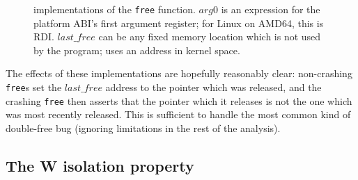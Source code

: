 \begin{figure}

  \caption{{\StateMachine} implementations of the \texttt{free}
    function. $arg0$ is an expression for the platform ABI's first
    argument register; for Linux on AMD64, this is RDI.
    $\mathit{last\_free}$ can be any fixed memory location which is
    not used by the program; {\implementation} uses an address in
    kernel space.}
  \label{fig:library_free}
\end{figure}

The effects of these implementations are hopefully reasonably clear:
non-crashing \texttt{free}s set the $\mathit{last\_free}$ address to
the pointer which was released, and the crashing \texttt{free} then
asserts that the pointer which it releases is not the one which was
most recently released.  This is sufficient to handle the most common
kind of double-free bug (ignoring limitations in the rest of the
analysis).  

\subsection{The W isolation property}

\label{sect:derive:w_isolation}


